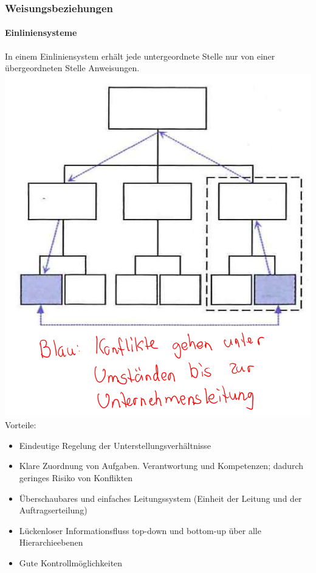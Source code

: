 \subsubsection{Weisungsbeziehungen}
\begin{multicols}{2}
	\paragraph{Einliniensysteme}
	In einem Einliniensystem erhält jede untergeordnete Stelle nur von einer übergeordneten Stelle Anweisungen.
	\includegraphics[width=0.7\linewidth]{images/einliniensystem} \\
	Vorteile:
	\begin{itemize}
		\item Eindeutige Regelung der Unterstellungsverhältnisse
		\item Klare Zuordnung von Aufgaben. Verantwortung und Kompetenzen; dadurch geringes Risiko von Konflikten
		\item Überschaubares und einfaches Leitungssystem (Einheit der Leitung und der Auftragserteilung)
		\item Lückenloser Informationsfluss top-down und bottom-up über alle Hierarchieebenen
		\item Gute Kontrollmöglichkeiten
	\end{itemize}
	

\end{multicols}
